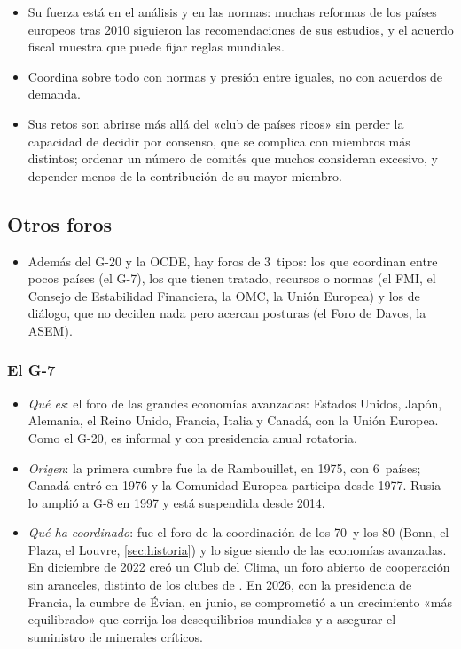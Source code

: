 \documentclass[11pt]{article}
\begin{document}
\begin{itemize}
  \begin{itemize}
  \item Su fuerza está en el análisis y en las normas: muchas reformas de los países europeos tras 2010 siguieron las recomendaciones de sus estudios, y el acuerdo fiscal muestra que puede fijar reglas mundiales.
  \item Coordina sobre todo con normas y presión entre iguales, no con acuerdos de demanda.
  \item Sus retos son abrirse más allá del «club de países ricos» sin perder la capacidad de decidir por consenso, que se complica con miembros más distintos; ordenar un número de comités que muchos consideran excesivo, y depender menos de la contribución de su mayor miembro.
  \end{itemize}
\end{itemize}

\subsection{Otros foros}\label{sec:otros-foros}

\begin{itemize}
\item Además del G-20 y la OCDE, hay foros de 3~tipos: los que coordinan entre pocos países (el G-7), los que tienen tratado, recursos o normas (el FMI, el Consejo de Estabilidad Financiera, la OMC, la Unión Europea) y los de diálogo, que no deciden nada pero acercan posturas (el Foro de Davos, la ASEM).
\end{itemize}

\subsubsection{El G-7}\label{sec:g7}

\begin{itemize}
\item \emph{Qué es}: el foro de las grandes economías avanzadas: Estados Unidos, Japón, Alemania, el Reino Unido, Francia, Italia y Canadá, con la Unión Europea. Como el G-20, es informal y con presidencia anual rotatoria.
\item \emph{Origen}: la primera cumbre fue la de Rambouillet, en 1975, con 6~países; Canadá entró en 1976 y la Comunidad Europea participa desde 1977. Rusia lo amplió a G-8 en 1997 y está suspendida desde 2014.
\item \emph{Qué ha coordinado}: fue el foro de la coordinación de los 70~y los 80 (Bonn, el Plaza, el Louvre, \ref{sec:historia}) y lo sigue siendo de las economías avanzadas. En diciembre de 2022 creó un Club del Clima, un foro abierto de cooperación sin aranceles, distinto de los clubes de \textcite{Nordhaus2015Climate}\nocite{G72022ClimateClub} . En 2026, con la presidencia de Francia, la cumbre de Évian, en junio, se comprometió a un crecimiento «más equilibrado» que corrija los desequilibrios mundiales y a asegurar el suministro de minerales críticos\nocite{G72026Evian}.
\end{itemize}
\end{document}
